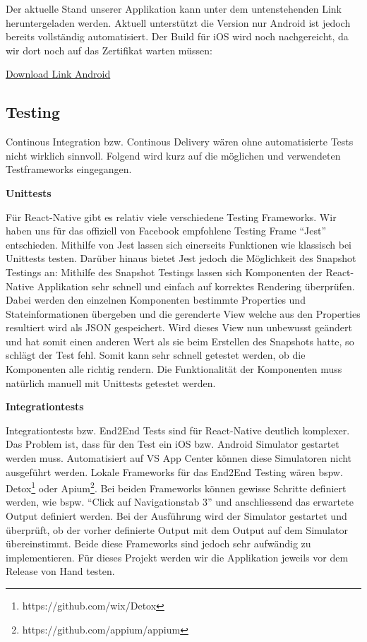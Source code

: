 Der aktuelle Stand unserer Applikation kann unter dem untenstehenden Link heruntergeladen werden. Aktuell unterstützt die Version nur Android ist jedoch bereits vollständig automatisiert. Der Build für iOS wird noch nachgereicht, da wir dort noch auf das Zertifikat warten müssen:

\href{https://install.appcenter.ms/users/yvo.broennimann/apps/the-gamechanger/distribution_groups/alphatesters}{Download Link Android}


\subsection{Testing} \label{testing}
Continous Integration bzw. Continous Delivery wären ohne automatisierte Tests nicht wirklich sinnvoll. Folgend wird kurz auf die möglichen und verwendeten Testframeworks eingegangen.

\textbf{Unittests}

Für React-Native gibt es relativ viele verschiedene Testing Frameworks. Wir haben uns für das offiziell von Facebook empfohlene Testing Frame ``Jest'' entschieden. Mithilfe von Jest lassen sich einerseits Funktionen wie klassisch bei Unittests testen. Darüber hinaus bietet Jest jedoch die Möglichkeit des Snapshot Testings an: Mithilfe des Snapshot Testings lassen sich Komponenten der React-Native Applikation sehr schnell und einfach auf korrektes Rendering überprüfen. Dabei werden den einzelnen Komponenten bestimmte Properties und Stateinformationen übergeben und die gerenderte View welche aus den Properties resultiert wird als JSON gespeichert. Wird dieses View nun unbewusst geändert und hat somit einen anderen Wert als sie beim Erstellen des Snapshots hatte, so schlägt der Test fehl. Somit kann sehr schnell getestet werden, ob die Komponenten alle richtig rendern. Die Funktionalität der Komponenten muss natürlich manuell mit Unittests getestet werden.

\textbf{Integrationtests}

Integrationtests bzw. End2End Tests sind für React-Native deutlich komplexer. Das Problem ist, dass für den Test ein iOS bzw. Android Simulator gestartet werden muss. Automatisiert auf VS App Center können diese Simulatoren nicht ausgeführt werden. Lokale Frameworks für das End2End Testing wären bspw. Detox\footnote{https://github.com/wix/Detox} oder Apium\footnote{https://github.com/appium/appium}. Bei beiden Frameworks können gewisse Schritte definiert werden, wie bspw. ``Click auf Navigationstab 3'' und anschliessend das erwartete Output definiert werden. Bei der Ausführung wird der Simulator gestartet und überprüft, ob der vorher definierte Output mit dem Output auf dem Simulator übereinstimmt. Beide diese Frameworks sind jedoch sehr aufwändig zu implementieren. Für dieses Projekt werden wir die Applikation jeweils vor dem Release von Hand testen. 

